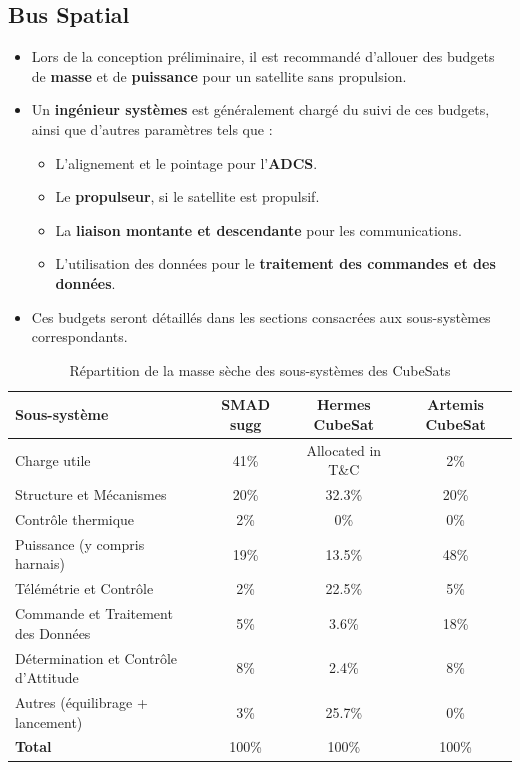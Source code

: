 \subsection{Bus Spatial}
\begin{itemize}
    \item Lors de la conception préliminaire, il est recommandé d'allouer des budgets de \textbf{masse} et de \textbf{puissance} pour un satellite sans propulsion.
    \item Un \textbf{ingénieur systèmes} est généralement chargé du suivi de ces budgets, ainsi que d'autres paramètres tels que :
    \begin{itemize}
        \item L'alignement et le pointage pour l'\textbf{ADCS}.
        \item Le \textbf{propulseur}, si le satellite est propulsif.
        \item La \textbf{liaison montante et descendante} pour les communications.
        \item L'utilisation des données pour le \textbf{traitement des commandes et des données}.
    \end{itemize}
    \item Ces budgets seront détaillés dans les sections consacrées aux sous-systèmes correspondants.
\end{itemize}

\begin{table}[h]
    \centering
    \begin{tabular}{|l|c|c|c|}
        \hline
        \textbf{Sous-système} & \textbf{SMAD sugg} & \textbf{Hermes CubeSat} & \textbf{Artemis CubeSat} \\
        \hline
        Charge utile & 41\% & Allocated in T\&C & 2\% \\
        \hline
        Structure et Mécanismes & 20\% & 32.3\% & 20\% \\
        \hline
        Contrôle thermique & 2\% & 0\% & 0\% \\
        \hline
        Puissance (y compris harnais) & 19\% & 13.5\% & 48\% \\
        \hline
        Télémétrie et Contrôle & 2\% & 22.5\% & 5\% \\
        \hline
        Commande et Traitement des Données & 5\% & 3.6\% & 18\% \\
        \hline
        Détermination et Contrôle d'Attitude & 8\% & 2.4\% & 8\% \\
        \hline
        Autres (équilibrage + lancement) & 3\% & 25.7\% & 0\% \\
        \hline
        \textbf{Total} & 100\% & 100\% & 100\% \\
        \hline
    \end{tabular}
    \caption{Répartition de la masse sèche des sous-systèmes des CubeSats}
    \label{tab:subsystem_mass}
\end{table}




